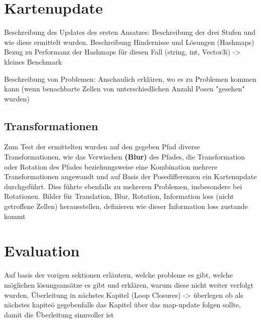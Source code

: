 \section{Kartenupdate}

Beschreibung des Updates des ersten Ansatzes:
Beschreibung der drei Stufen und wie diese ermittelt wurden.
Beschreibung Hindernisse und Lösungen (Hashmaps)
Bezug zu Performanz der Hashmaps für diesen Fall (string, int, Vector3i)
-> kleines Benchmark

Beschreibung von Problemen:
Anschaulich erklären, wo es zu Problemen kommen kann (wenn benachbarte Zellen von unterschiedlichen Anzahl Posen "gesehen" wurden)

\subsection{Transformationen}




Zum Test der ermittelten wurden auf den gegeben Pfad diverse Transformationen, wie das Verwischen \textbf{(Blur)} des Pfades, die Transformation oder Rotation des Pfades beziehungsweise eine Kombination mehrere Transformationen angewandt und auf Basis der Posedifferenzen ein Kartenupdate durchgeführt. Dies führte ebenfalls zu mehreren Problemen, insbesondere bei Rotationen.
Bilder für Translation, Blur, Rotation, Information loss (nicht getroffene Zellen) herausstellen, definieren wie dieser Information loss zustande kommt

\section{Evaluation}

Auf basis der vorigen sektionen erläutern, welche probleme es gibt, welche möglichen lösungsansätze es gibt und erklären, warum diese nicht weiter verfolgt wurden,
Überleitung in nächstes Kapitel (Loop Closures)
-> überlegen ob als nächstes kapiteö gegebenfalls das Kapitel über das map-update folgen sollte, damit die Überleitung sinnvoller ist



